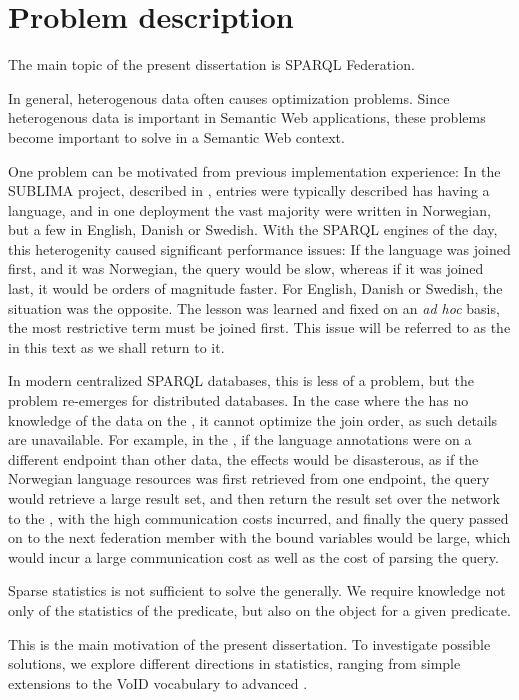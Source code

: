 \section{Problem description}

The main topic of the present dissertation is SPARQL
Federation.

In general, heterogenous data often causes optimization
problems. Since heterogenous data is important in Semantic Web
applications, these problems become important to solve in a Semantic
Web context.

One problem can be motivated from previous implementation experience:
In the SUBLIMA project, described in \cite{sublima}, entries were
typically described has having a language, and in one deployment the
vast majority were written in Norwegian, but a few in English, Danish
or Swedish. With the SPARQL engines of the day, this heterogenity
caused significant performance issues: If the language was joined
first, and it was Norwegian, the query would be slow, whereas if it
was joined last, it would be orders of magnitude faster. For English,
Danish or Swedish, the situation was the opposite. The lesson was
learned and fixed on an \textit{ad hoc} basis, the most restrictive
term must be joined first. This issue will be referred to as the
\langcase{} in this text as we shall return to it.

In modern centralized SPARQL databases, this is less of a problem, but
the problem re-emerges for distributed databases. In the case where
the \fedeng{} has no knowledge of the data on the \indendp, it cannot
optimize the join order, as such details are unavailable. For example,
in the \langcase, if the language annotations were on a different
endpoint than other data, the effects would be disasterous, as if the
Norwegian language resources was first retrieved from one endpoint,
the query would retrieve a large result set, and then return the
result set over the network to the \fedeng, with the high
communication costs incurred, and finally the query passed on to the
next federation member with the bound variables would be large, which
would incur a large communication cost as well as the cost of parsing
the query. 

Sparse statistics is not sufficient to solve the \langcase{}
generally. We require knowledge not only of the statistics of the
predicate, but also on the object for a given predicate.

This is the main motivation of the present dissertation. To investigate
possible solutions, we explore different directions in statistics,
ranging from simple extensions to the VoID vocabulary\cite{void} to
advanced \SRL.